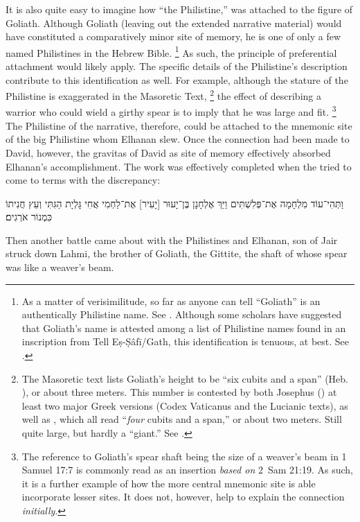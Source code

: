 It is also quite easy to imagine how ``the Philistine,'' was attached to the figure of Goliath. Although Goliath (leaving out the extended narrative material) would have constituted a comparatively minor site of memory, he is one of only a few named Philistines in the Hebrew Bible.%
    \footnote{As a matter of verisimilitude, so far as anyone can tell ``Goliath'' is an authentically Philistine name. See \autocite[291]{mccarter1980}. Although some scholars have suggested that Goliath's name is attested among a list of Philistine names found in an inscription from Tell Eṣ-Ṣâfī/Gath, this identification is tenuous, at best. See \cite{maeir-etal_basor2008}.}
As such, the principle of preferential attachment would likely apply. The specific details of the Philistine's description contribute to this identification as well. For example, although the stature of the Philistine is exaggerated in the Masoretic Text,%
    \footnote{The Masoretic text lists Goliath's height to be ``six cubits and a span'' (Heb. ), or about three meters. This number is contested by both Josephus () at least two major Greek versions (Codex Vaticanus and the Lucianic texts), as well as , which all read ``\emph{four} cubits and a span,'' or about two meters. Still quite large, but hardly a ``giant.'' See \cite[286]{mccarter1980}.}
the effect of describing a warrior who could wield a girthy spear is to imply that he was large and fit.%
    \footnote{The reference to Goliath's spear shaft being the size of a weaver's beam in 1 Samuel 17:7 is commonly read as an insertion \emph{based on} 2~Sam 21:19. As such, it is a further example of how the more central mnemonic site is able incorporate lesser sites. It does not, however, help to explain the connection \emph{initially}.}
The Philistine of the narrative, therefore, could be attached to the mnemonic site of the big Philistine whom Elhanan slew. Once the connection had been made to David, however, the gravitas of David as site of memory effectively absorbed Elhanan's accomplishment. The work was effectively completed when the \chronicler tried to come to terms with the discrepancy:
\begin{hebrewtext}
    וַתְּהִי־עוֹד מִלְחָמָה אֶת־פְּלִשְׁתִּים וַיַּךְ אֶלְחָנָן בֶּן־יָעוּר [יָעִיר] אֶת־לַחְמִי אֲחִי גָּלְיָת הַגִּתִּי וְעֵץ חֲנִיתוֹ כִּמְנוֹר אֹרְגִים׃ 
\end{hebrewtext}
\begin{translation}
    Then another battle came about with the Philistines and Elhanan, son of Jair struck down Lahmi, the brother of Goliath, the Gittite, the shaft of whose spear was like a weaver's beam.
\end{translation}
